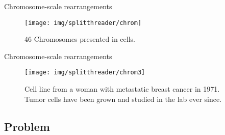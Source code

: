 \documentclass[10pt]{beamer}
\newcommand{\1}{
        	\setbeamertemplate{background}{
        		\texttt{[image: img/1\_BIO]}
        		\tikz[overlay] \fill[fill opacity=0.75,fill=white] (0,0) rectangle (-\paperwidth,\paperheight);
        	}
}
\begin{document}
\begin{frame}{Chromosome-scale rearrangements}{}
	\begin{figure}
		\centering
		\texttt{[image: img/splitthreader/chrom]}
		\caption{46 Chromosomes presented in cells.}
	\end{figure}		
\end{frame}

\begin{frame}{Chromosome-scale rearrangements}{}
	\begin{figure}
		\centering
		\texttt{[image: img/splitthreader/chrom3]}
		\caption{Cell line from a woman with metastatic breast cancer in 1971. Tumor cells have been grown and studied in the lab ever since.}
	\end{figure}		
\end{frame}

\subsection{Problem}
\end{document}
